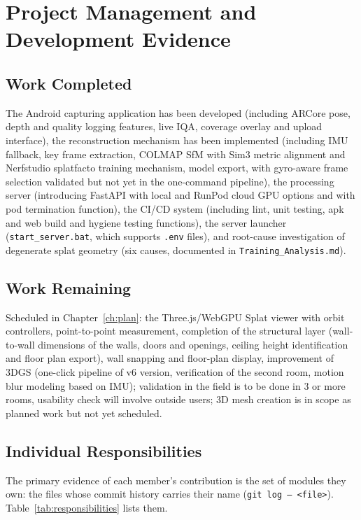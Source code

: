 \chapter{Project Management and Development Evidence}
\label{ch:evidence}

\section{Work Completed}
The Android capturing application has been developed (including ARCore pose, depth and quality logging features, live IQA, coverage overlay and upload interface), the reconstruction mechanism has been implemented (including IMU fallback, key frame extraction, COLMAP SfM with Sim3 metric alignment and Nerfstudio splatfacto training mechanism, model export, with gyro-aware frame selection validated but not yet in the one-command pipeline), the processing server (introducing FastAPI with local and RunPod cloud GPU options and with pod termination function), the CI/CD system (including lint, unit testing, apk and web build and hygiene testing functions), the server launcher (\texttt{start\_server.bat}, which supports \texttt{.env} files), and root-cause investigation of degenerate splat geometry (six causes, documented in \texttt{Training\_Analysis.md}).

\section{Work Remaining}
Scheduled in Chapter~\ref{ch:plan}: the Three.js/WebGPU Splat viewer with orbit controllers, point-to-point measurement, completion of the structural layer (wall-to-wall dimensions of the walls, doors and openings, ceiling height identification and floor plan export), wall snapping and floor-plan display, improvement of 3DGS (one-click pipeline of v6 version, verification of the second room, motion blur modeling based on IMU); validation in the field is to be done in 3 or more rooms, usability check will involve outside users; 3D mesh creation is in scope as planned work but not yet scheduled.

\section{Individual Responsibilities}

The primary evidence of each member's contribution is the set of modules they own: the files whose commit history carries their name (\texttt{git log -- <file>}). Table~\ref{tab:responsibilities} lists them.

